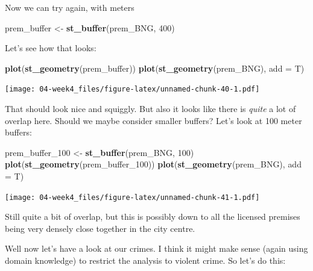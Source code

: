 \documentclass[]{book}
\newenvironment{Shaded}{\begin{snugshade}}{\end{snugshade}}
\newcommand{\DataTypeTok}[1]{\textcolor[rgb]{0.13,0.29,0.53}{#1}}
\newcommand{\DecValTok}[1]{\textcolor[rgb]{0.00,0.00,0.81}{#1}}
\newcommand{\KeywordTok}[1]{\textcolor[rgb]{0.13,0.29,0.53}{\textbf{#1}}}
\newcommand{\NormalTok}[1]{#1}
\newcommand{\OperatorTok}[1]{\textcolor[rgb]{0.81,0.36,0.00}{\textbf{#1}}}
\newcommand{\StringTok}[1]{\textcolor[rgb]{0.31,0.60,0.02}{#1}}
\begin{document}
Now we can try again, with meters

\begin{Shaded}
\begin{Highlighting}[]
\NormalTok{prem_buffer <-}\StringTok{ }\KeywordTok{st_buffer}\NormalTok{(prem_BNG, }\DecValTok{400}\NormalTok{)}
\end{Highlighting}
\end{Shaded}

Let's see how that looks:

\begin{Shaded}
\begin{Highlighting}[]
\KeywordTok{plot}\NormalTok{(}\KeywordTok{st_geometry}\NormalTok{(prem_buffer))}
\KeywordTok{plot}\NormalTok{(}\KeywordTok{st_geometry}\NormalTok{(prem_BNG), }\DataTypeTok{add =}\NormalTok{ T)}
\end{Highlighting}
\end{Shaded}

\texttt{[image: 04-week4\_files/figure-latex/unnamed-chunk-40-1.pdf]}

That should look nice and squiggly. But also it looks like there is \emph{quite} a lot of overlap here. Should we maybe consider smaller buffers? Let's look at 100 meter buffers:

\begin{Shaded}
\begin{Highlighting}[]
\NormalTok{prem_buffer_}\DecValTok{100}\NormalTok{ <-}\StringTok{ }\KeywordTok{st_buffer}\NormalTok{(prem_BNG, }\DecValTok{100}\NormalTok{)}
\KeywordTok{plot}\NormalTok{(}\KeywordTok{st_geometry}\NormalTok{(prem_buffer_}\DecValTok{100}\NormalTok{))}
\KeywordTok{plot}\NormalTok{(}\KeywordTok{st_geometry}\NormalTok{(prem_BNG), }\DataTypeTok{add =}\NormalTok{ T)}
\end{Highlighting}
\end{Shaded}

\texttt{[image: 04-week4\_files/figure-latex/unnamed-chunk-41-1.pdf]}

Still quite a bit of overlap, but this is possibly down to all the licensed premises being very densely close together in the city centre.

Well now let's have a look at our crimes. I think it might make sense (again using domain knowledge) to restrict the analysis to violent crime. So let's do this:

\begin{Shaded}
\end{Shaded}
\end{document}
